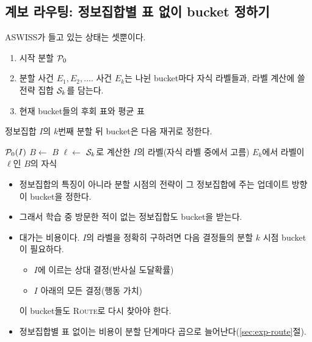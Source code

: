 \subsection{계보 라우팅: 정보집합별 표 없이 bucket 정하기}\label{sec:route}
ASWISS가 들고 있는 상태는 셋뿐이다.
\begin{enumerate}
  \item 시작 분할 $\mathcal{P}_0$
  \item 분할 사건 $E_1,E_2,\dots$. 사건 $E_k$는 나뉜 bucket마다 자식 라벨들과, 라벨 계산에 쓸 전략 집합 $\mathcal{S}_k$를 담는다.
  \item 현재 bucket들의 후회 표와 평균 표
\end{enumerate}
정보집합 $I$의 $k$번째 분할 뒤 bucket은 다음 재귀로 정한다.
\begin{algorithmic}[1]
   \Return $\mathcal{P}_0(I)$ \EndIf
  \State $B\gets$ 
   \Return $B$ \EndIf
  \State $\ell\gets$ $\mathcal{S}_k$로 계산한 $I$의 라벨(자식 라벨 중에서 고름)
  \State \Return $E_k$에서 라벨이 $\ell$인 $B$의 자식
\EndFunction
\end{algorithmic}
\begin{itemize}
  \item 정보집합의 특징이 아니라 분할 시점의 전략이 그 정보집합에 주는 업데이트 방향이 bucket을 정한다.
  \item 그래서 학습 중 방문한 적이 없는 정보집합도 bucket을 받는다.
  \item 대가는 비용이다. $I$의 라벨을 정확히 구하려면 다음 결정들의 분할 $k$ 시점 bucket이 필요하다.
    \begin{itemize}
      \item $I$에 이르는 상대 결정(반사실 도달확률)
      \item $I$ 아래의 모든 결정(행동 가치)
    \end{itemize}
    이 bucket들도 \textsc{Route}로 다시 찾아야 한다.
  \item 정보집합별 표 없이는 비용이 분할 단계마다 곱으로 늘어난다(\ref{sec:exp-route}절).
\end{itemize}

